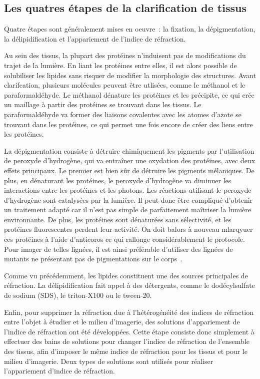 \documentclass[\main/main.tex]{subfiles}
\begin{document}
\subsection{Les quatres étapes de la clarification de tissus}

Quatre étapes sont généralement mises en oeuvre~\cite{tainaka_2016,ueda_2020}: la fixation, la dépigmentation, la délipidification et l'appariement de l'indice de réfraction.
%

%
Au sein des tissus, la plupart des protéines n'induisent pas de modifications du trajet de la lumière. En liant les protéines entre elles, il est alors possible de solubiliser les lipides sans risquer de modifier la morphologie des structures. Avant clarifcation, plusieurs molécules peuvent être utlisées, comme le méthanol et le paraformaldéhyde. Le méthanol dénature les protéines et les précipite, ce qui crée un maillage à partir des protéines se trouvant dans les tissus. Le paraformaldéhyde va former des liaisons covalentes avec les atomes d'azote se trouvant dans les protéines, ce qui permet une fois encore de créer des liens entre les protéines.

%
La dépigmentation consiste à détruire chimiquement les pigments par l'utilisation de peroxyde d'hydrogène, qui va entraîner une oxydation des protéines, avec deux effets principaux. Le premier est bien sûr de détruire les pigments mélaniques. De plus, en dénaturant les protéines, le peroxyde d'hydrogène va diminuer les interactions entre les protéines et les photons.
%
Les réactions utilisant le peroxyde d'hydrogène sont catalysées par la lumière. Il peut donc être compliqué d'obtenir un traitement adapté car il n'est pas simple de parfaitement maîtriser la lumière environnante. De plus, les protéines sont dénaturées sans sélectivité, et les protéines fluorescentes perdent leur activité. On doit balors à nouveau mlarqyuer ces protéines à l'aide d'anticoros ce qui rallonge considérablement le protocole.
%
Pour imager de telles lignées, il est ainsi préférable d'utiliser des lignées de  mutants ne présentant pas de pigmentations sur le corps~\cite{white_2008,antinucci_2016}.

Comme vu précédemment, les lipides constituent une des sources principales de réfraction. %
%
La délipidification fait appel à des détergents, comme le dodécylsulfate de sodium (SDS), le triton-X100 ou le tween-20.

%
Enfin, pour supprimer la réfraction due à l'hétérogénéité des indices de réfraction entre l'objet à étudier et le milieu d'imagerie, des solutions d'appariement de l'indice de réfraction ont été développées.
%
Cette étape consiste donc simplement à effectuer des bains de solutions pour changer l'indice de réfraction de l'ensemble des tissus, afin d'imposer le même indice de réfraction pour les tissus et pour le milieu d'imagerie.
%
Deux types de solutions sont utilisés pour réaliser l'appariement d'indice de réfraction.
\end{document}
